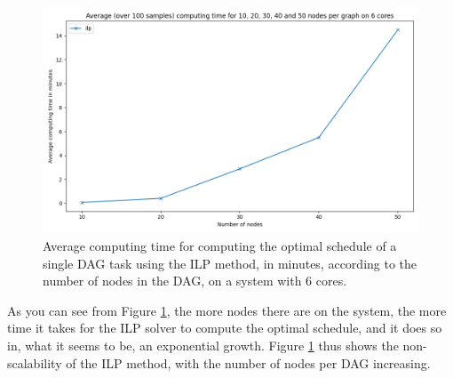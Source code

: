 \begin{figure}
    \centering
    \includegraphics[width=\linewidth]{images/result_computing_time_ilp_m6.png}
    \caption{Average computing time for computing the optimal schedule
    of a single DAG task using the ILP method, in minutes, according to 
    the number of nodes in the DAG, on a system with 6 cores.}
    \label{fig:ilp_compute_time}
\end{figure}

As you can see from Figure \ref{fig:ilp_compute_time}, the more nodes there are on the system, 
the more time it takes for the ILP solver to compute the optimal schedule,
and it does so in, what it seems to be, an exponential growth.
Figure \ref{fig:ilp_compute_time} thus shows the non-scalability
of the ILP method, with the number of nodes per DAG increasing.

